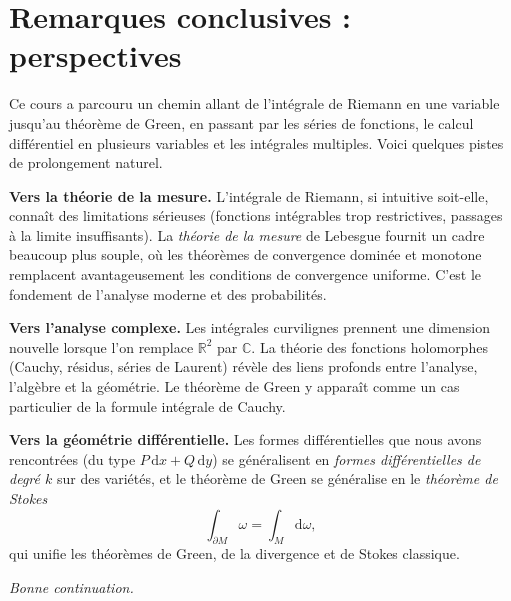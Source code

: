 \documentclass[12pt,a4paper,openany]{book}
\theoremstyle{definition}
\newcommand{\R}{\mathbb{R}}
\newcommand{\C}{\mathbb{C}}
\newcommand{\dd}{\mathrm{d}}
\begin{document}

\section*{Remarques conclusives : perspectives}

Ce cours a parcouru un chemin allant de l'intégrale de Riemann en une
variable jusqu'au théorème de Green, en passant par les séries de
fonctions, le calcul différentiel en plusieurs variables et les
intégrales multiples. Voici quelques pistes de prolongement naturel.

\medskip

\noindent\textbf{Vers la théorie de la mesure.}
L'intégrale de Riemann, si intuitive soit-elle, connaît des limitations
sérieuses (fonctions intégrables trop restrictives, passages à la limite
insuffisants). La \emph{théorie de la mesure} de Lebesgue fournit un
cadre beaucoup plus souple, où les théorèmes de convergence dominée et
monotone remplacent avantageusement les conditions de convergence
uniforme. C'est le fondement de l'analyse moderne et des probabilités.

\medskip

\noindent\textbf{Vers l'analyse complexe.}
Les intégrales curvilignes prennent une dimension nouvelle lorsque l'on
remplace $\R^2$ par $\C$. La théorie des fonctions holomorphes
(Cauchy, résidus, séries de Laurent) révèle des liens profonds entre
l'analyse, l'algèbre et la géométrie. Le théorème de Green y apparaît
comme un cas particulier de la formule intégrale de Cauchy.

\medskip

\noindent\textbf{Vers la géométrie différentielle.}
Les formes différentielles que nous avons rencontrées (du type
$P\,\dd x + Q\,\dd y$) se généralisent en \emph{formes
différentielles de degré $k$} sur des variétés, et le théorème de
Green se généralise en le \emph{théorème de Stokes}
\[
  \int_{\partial M}\omega = \int_M \dd\omega,
\]
qui unifie les théorèmes de Green, de la divergence et de Stokes classique.

\bigskip

\hfill\emph{Bonne continuation.}


\end{document}
